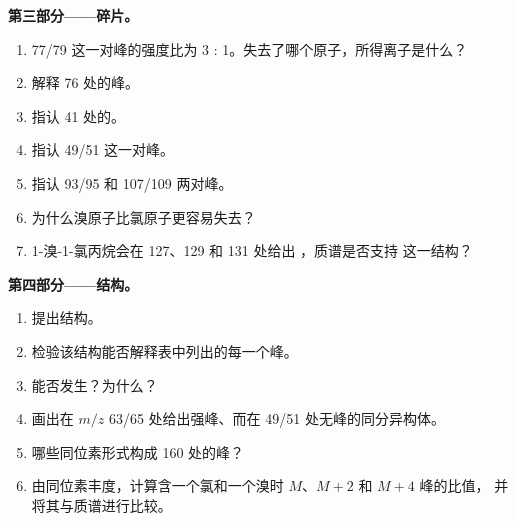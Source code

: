 \begin{problem}
\medskip
\noindent\textbf{第三部分——碎片。}
\begin{enumerate}[resume]
  \item 77/79 这一对峰的强度比为 3 : 1。失去了哪个原子，所得离子是什么？
  \item 解释 76 处的峰。
  \item 指认 41 处的。
  \item 指认 49/51 这一对峰。
  \item 指认 93/95 和 107/109 两对峰。
  \item 为什么溴原子比氯原子更容易失去？
  \item 1-溴-1-氯丙烷会在 127、129 和 131 处给出 ，质谱是否支持
        这一结构？
\end{enumerate}

\medskip
\noindent\textbf{第四部分——结构。}
\begin{enumerate}[resume]
  \item 提出结构。
  \item 检验该结构能否解释表中列出的每一个峰。
  \item 能否发生？为什么？
  \item 画出在 $m/z$ 63/65 处给出强峰、而在 49/51 处无峰的同分异构体。
  \item 哪些同位素形式构成 160 处的峰？
  \item 由同位素丰度，计算含一个氯和一个溴时 $M$、$M+2$ 和 $M+4$ 峰的比值，
        并将其与质谱进行比较。
\end{enumerate}
\end{problem}
